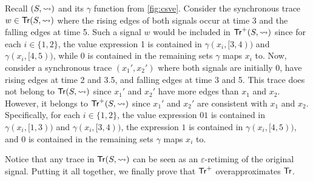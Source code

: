 \begin{example} \label{ex:overapx}
	Recall \((S, {\rightsquigarrow})\) and its \(\gamma\) function from \cref{fig:csve}.
	Consider the synchronous trace \(w \in \mathsf{Tr}(S, {\rightsquigarrow})\) where the rising edges of both signals occur at time 3 and the falling edges at time 5.
	Such a signal \( w \) would be included in \(\mathsf{Tr}^+(S,{\rightsquigarrow})\) since for each \(i \in \{1,2\}\), the value expression 1 is contained in \(\gamma(x_i, [3,4))\) and \(\gamma(x_i, [4,5))\), while 0 is contained in the remaining sets \(\gamma\) maps \(x_i\) to.
	Now, consider a synchronous trace \((x_1', x_2')\) where both signals are initially 0, have rising edges at time 2 and 3.5, and falling edges at time 3 and 5.
	This trace does not belong to \(\mathsf{Tr}(S, {\rightsquigarrow})\) since \(x_1'\) and \(x_2'\) have more edges than \(x_1\) and \(x_2\).
	However, it belongs to \(\mathsf{Tr}^+(S,{\rightsquigarrow})\) since \(x_1'\) and \(x_2'\) are consistent with \(x_1\) and \(x_2\).
	Specifically, for each \(i \in \{1,2\}\), the value expression \(01\) is contained in \(\gamma(x_i, [1,3))\) and \(\gamma(x_i, [3,4))\), the expression \(1\) is contained in \(\gamma(x_i, [4,5))\), and 0 is contained in the remaining sets \(\gamma\) maps \(x_i\) to.
\end{example}

Notice that any trace in $\mathsf{Tr}(S,\rightsquigarrow)$ can be seen as an $\varepsilon$-retiming of the original signal.
Putting it all together, we finally prove that $\mathsf{Tr}^+$ overapproximates $\mathsf{Tr}$.

